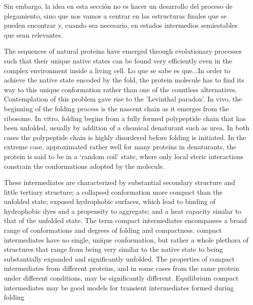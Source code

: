   
Sin embargo, la idea en esta sección no es hacer un desarrollo del proceso de plegamiento, sino que nos vamos a centrar en las estructuras finales que se pueden encontrar y, cuando sea necesario, en estados intermedios semiestables que sean relevantes.

The sequences of natural proteins have emerged through evolutionary processes such that their unique native states can be found very efficiently even in the complex environment inside a living cell.
Lo que se sabe es que...In order to achieve the native state encoded by the fold, the protein molecule has to find its way to this unique conformation rather than one of the countless alternatives. 
Contemplation of this problem gave rise to the 'Levinthal paradox'. 
In vivo, the beginning of the folding process is the nascent chain as it emerges from the ribosome. 
In vitro, folding begins from a fully formed polypeptide chain that has been unfolded, usually by addition of a chemical denaturant such as urea. 
In both cases the polypeptide chain is highly disordered before folding is initiated. 
In the extreme case, approximated rather well for many proteins in denaturants, the protein is said to be in a `random coil' state, where only local steric interactions constrain the conformations adopted by the molecule.



These intermediates are characterized by substantial secondary structure and little tertiary
structure; a collapsed conformation more compact than the unfolded state; exposed hydrophobic surfaces, 
which lead to binding of hydrophobic dyes
and a propensity to aggregate; 
and a heat capacity similar
to that of the unfolded state. 
The term compact intermediates
encompasses a broad range of conformations
and degrees of
folding and compactness.
compact intermediates have no single, unique conformation, but rather a whole plethora of structures that range from being very
similar to the native state to being substantially expanded and significantly unfolded. 
The properties of compact intermediates from different proteins, and in some cases from the same protein under different conditions, may be significantly different. 
Equilibrium compact intermediates may be good models for transient intermediates formed during folding

